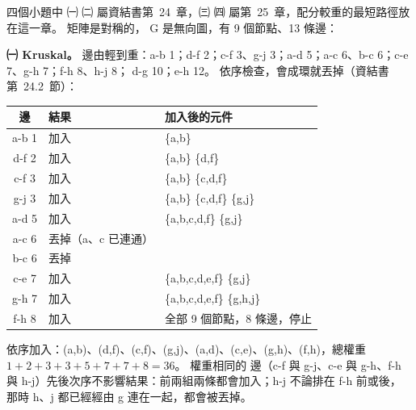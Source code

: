 \begin{pastsoln}
四個小題中 ㈠ ㈡ 屬資結書第~24~章，㈢ ㈣ 屬第~25~章，配分較重的最短路徑放在這一章。 矩陣是對稱的，
G 是無向圖，有 9 個節點、13 條邊：
\begin{center}
\end{center}

\textbf{㈠ Kruskal。} 邊由輕到重：a-b 1；d-f 2；c-f 3、g-j 3；a-d 5；a-c 6、b-c 6；c-e 7、g-h 7；f-h 8、h-j 8；
d-g 10；e-h 12。 依序檢查，會成環就丟掉（資結書第~24.2~節）：
\begin{center}
\begin{tabular}{cll}
\toprule
邊 & 結果 & 加入後的元件 \\
\midrule
a-b 1 & 加入 & \{a,b\} \\
d-f 2 & 加入 & \{a,b\} \{d,f\} \\
c-f 3 & 加入 & \{a,b\} \{c,d,f\} \\
g-j 3 & 加入 & \{a,b\} \{c,d,f\} \{g,j\} \\
a-d 5 & 加入 & \{a,b,c,d,f\} \{g,j\} \\
a-c 6 & 丟掉（a、c 已連通） & \\
b-c 6 & 丟掉 & \\
c-e 7 & 加入 & \{a,b,c,d,e,f\} \{g,j\} \\
g-h 7 & 加入 & \{a,b,c,d,e,f\} \{g,h,j\} \\
f-h 8 & 加入 & 全部 9 個節點，8 條邊，停止 \\
\bottomrule
\end{tabular}
\end{center}
依序加入：(a,b)、(d,f)、(c,f)、(g,j)、(a,d)、(c,e)、(g,h)、(f,h)，總權重 $1+2+3+3+5+7+7+8 = 36$。 權重相同的
邊（c-f 與 g-j、c-e 與 g-h、f-h 與 h-j）先後次序不影響結果：前兩組兩條都會加入；h-j 不論排在 f-h 前或後，
那時 h、j 都已經經由 g 連在一起，都會被丟掉。


\end{pastsoln}
